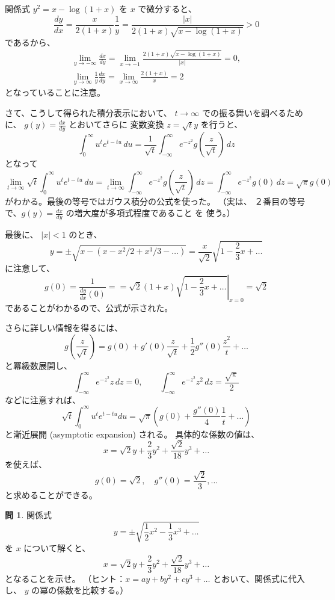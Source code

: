 \documentclass[a4paper]{jsarticle}
\theoremstyle{definition}
\newtheorem{Exercise}{問}%
\theoremstyle{remark}
\begin{document}
関係式 $y^2 = x - \log(1+x)$ を $x$ で微分すると、
\[
\frac{dy}{dx}
= \frac{x}{2(1+x)} \frac{1}{y} = \frac{|x|}{2(1+x)\sqrt{x-\log(1+x)}} >
0
\]
であるから、
\begin{gather*}
\lim_{y \to -\infty} \frac{dx}{dy} =
\lim_{x\to -1} \frac{2(1+x)\sqrt{x-\log(1+x)}}{|x|} = 0,\\
\lim_{y \to \infty} \frac{1}{y} \frac{dx}{dy} =
\lim_{x\to \infty} \frac{2(1+x)}{x} = 2
\end{gather*}
となっていることに注意。

さて、こうして得られた積分表示において、
$t \to \infty$ での振る舞いを調べるために、
$g(y) = \frac{dx}{dy}$ とおいてさらに
変数変換 $z = \sqrt{t} y$ を行うと、
\[
\int_0^{\infty} u^te^{t-tu}\,du =
\frac{1}{\sqrt{t}} \int_{-\infty}^{\infty}
e^{-z^2} g\left( \frac{z}{\sqrt{t}} \right)\,dz
\]
となって
\[
\lim_{t \to \infty}
\sqrt{t} \int_0^{\infty} u^te^{t-tu}\,du =
\lim_{t \to \infty} \int_{-\infty}^{\infty}
e^{-z^2} g\left( \frac{z}{\sqrt{t}} \right)\,dz
= \int_{-\infty}^{\infty} e^{-z^2} g(0)\,dz
= \sqrt{\pi} g(0)
\]
がわかる。最後の等号ではガウス積分の公式を使った。
（実は、
２番目の等号で、$g(y) = \frac{dx}{dy}$ の増大度が多項式程度であること
を
使う。）

最後に、
$|x| < 1$ のとき、
\[
y = \pm \sqrt{x - (x - x^2/2 + x^3/3 - \dots)}
= \frac{x}{\sqrt{2}} \sqrt{1 - \frac{2}{3}x + \dots}
\]
に注意して、
\[
g(0) = \frac{1}{\frac{dy}{dx}(0)} =
= \left. \sqrt{2}(1+x)\sqrt{1 - \frac{2}{3}x + \dots}\right|_{x=0}
= \sqrt{2}
\]
であることがわかるので、公式が示された。

さらに詳しい情報を得るには、
\[
g\left( \frac{z}{\sqrt{t}} \right)
= g(0) + g'(0) \frac{z}{\sqrt{t}} + \frac{1}{2} g''(0) \frac{z^2}{t}
+ \dots
\]
と冪級数展開し、
\[
\int_{-\infty}^\infty e^{-z^2} z\,dz = 0,
\qquad
\int_{-\infty}^\infty e^{-z^2} z^2\,dz = \frac{\sqrt{\pi}}{2}
\]
などに注意すれば、
\[
\sqrt{t} \int_0^\infty u^t e^{t-tu} du =
\sqrt{\pi}
\left(
g(0) + \frac{g''(0)}{4} \frac{1}{t} + \dots
\right)
\]
と漸近展開 (asymptotic expansion) される。
具体的な係数の値は、
\[
x = \sqrt{2} y + \frac{2}{3}y^2 + \frac{\sqrt{2}}{18} y^3
+ \dots
\]
を使えば、
\[
g(0) = \sqrt{2}, \quad g''(0) = \frac{\sqrt{2}}{3}, \dots
\]
と求めることができる。

\begin{Exercise}
関係式
\[
y = \pm \sqrt{\frac{1}{2}x^2 - \frac{1}{3}x^3 + \dots}
\]
を $x$ について解くと、
\[
x = \sqrt{2} y + \frac{2}{3} y^2 + \frac{\sqrt{2}}{18} y^3 + \dots
\]
となることを示せ。
（ヒント：$x = a y + by^2 + cy^3 + \dots$ とおいて、関係式に代入し、
$y$ の冪の係数を比較する。）
\end{Exercise}
\end{document}
